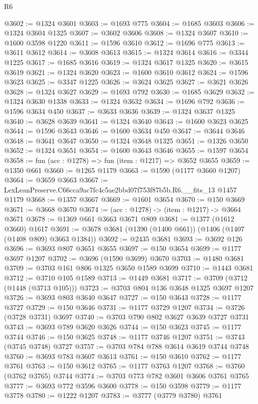 \begin{lexlean}{R6}
\begin{coremodule}
@3602 := @1324 @3601
@3603 := @1693 @775
@3604 := @1685 @3603
@3606 := @1324 @3604 @1325
@3607 := @3602 @3606
@3608 := @1324 @3607
@3610 := @1600 @3598 @1220
@3611 := @1596 @3610
@3612 := @1696 @775
@3613 := @3611 @3612
@3614 := @3608 @3613
@3615 := @1324 @3614
@3616 := @3344 @1225
@3617 := @1685 @3616
@3619 := @1324 @3617 @1325
@3620 := @3615 @3619
@3621 := @1324 @3620
@3623 := @1600 @3610 @3612
@3624 := @1596 @3623
@3625 := @3347 @1225
@3626 := @3624 @3625
@3627 := @3621 @3626
@3628 := @1324 @3627
@3629 := @1693 @792
@3630 := @1685 @3629
@3632 := @1324 @3630 @1338
@3633 := @1324 @3632
@3634 := @1696 @792
@3636 := @1596 @3634 @450
@3637 := @3633 @3636
@3639 := @1324 @3637 @1325
@3640 := @3628 @3639
@3641 := @1324 @3640
@3643 := @1600 @3623 @3625
@3644 := @1596 @3643
@3646 := @1600 @3634 @450
@3647 := @3644 @3646
@3648 := @3641 @3647
@3650 := @1324 @3648 @1325
@3651 := @1326 @3650
@3652 := @1324 @3651
@3654 := @1600 @3643 @3646
@3655 := @1597 @3654
@3658 := fun (acc : @1278) => fun (item : @1217) => @3652 @3655
@3659 := @1350 @661
@3660 := @1265 @1179
@3663 := @1590 (@1177 @3660 @1207)
@3664 := @3659 @3663
@3667 := LexLeanPreserve.C66cca9ac7fc4c5ae2bbd07f753f87b5b.R6.__fits_13 @1457 @1179
@3668 := @1357 @3667
@3669 := @1601 @3654
@3670 := @150 @3669
@3671 := @3668 @3670
@3674 := (acc : @1278) -> (item : @1217) -> @3664 @3671
@3678 := @1369 @661 @3663 @3671 @809
@3681 := @1377 (@1612 @3660) @1617
@3691 := @3678 @3681 (@1390 (@1400 @661)) (@1406 (@1407 (@1408 @809) @3663 @1384))
@3692 := @2435 @3681
@3693 := @3692 @126
@3696 := @3693 @807 @3651 @3655
@3697 := @150 @3654
@3699 := @1177 @3697 @1207
@3702 := @3696 (@1590 @3699) @3670
@3703 := @1480 @3681
@3709 := @3703 @161 @806 @1325 @3650 @1589 @3699
@3710 := @1443 @3681
@3712 := @3710 @105 @1589
@3713 := @1449 @3681
@3717 := @3709 (@3712 (@1448 (@3713 @105)))
@3723 := @3703 @804 @136 @3648 @1325 @3697 @1207
@3726 := @3693 @803 @3640 @3647
@3727 := @150 @3643
@3728 := @1177 @3727
@3729 := @150 @3646
@3731 := @1177 @3729 @1207
@3734 := @3726 (@3728 @3731) @3697
@3740 := @3703 @790 @802 @3627 @3639 @3727 @3731
@3743 := @3693 @789 @3620 @3626
@3744 := @150 @3623
@3745 := @1177 @3744
@3746 := @150 @3625
@3748 := @1177 @3746 @1207
@3751 := @3743 (@3745 @3748) @3727
@3757 := @3703 @784 @788 @3614 @3619 @3744 @3748
@3760 := @3693 @783 @3607 @3613
@3761 := @150 @3610
@3762 := @1177 @3761
@3763 := @150 @3612
@3765 := @1177 @3763 @1207
@3768 := @3760 (@3762 @3765) @3744
@3774 := @3703 @773 @782 @3601 @3606 @3761 @3765
@3777 := @3693 @772 @3596 @3600
@3778 := @150 @3598
@3779 := @1177 @3778
@3780 := @1222 @1207
@3783 := @3777 (@3779 @3780) @3761

\end{coremodule}
\end{lexlean}
